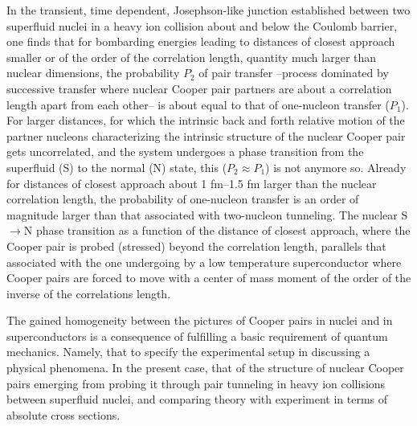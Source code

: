 In the transient, time dependent, Josephson-like junction established between two superfluid nuclei     in a heavy ion collision about and below the Coulomb barrier, one finds that for bombarding energies leading to distances of closest approach smaller or of the order of the correlation length, quantity much larger than nuclear dimensions, the probability $P_2$ of pair transfer --process dominated by successive transfer where nuclear Cooper pair partners are about a correlation length apart from each other-- is about equal to that of one-nucleon transfer ($P_1$). For larger distances, for which the intrinsic back and forth relative motion of the partner nucleons characterizing the intrinsic structure of the nuclear Cooper pair gets uncorrelated, and the system undergoes a phase transition from the superfluid (S) to the normal (N) state, this ($P_2\approx P_1$) is not anymore so. Already for distances of closest approach about 1 fm--1.5 fm larger than the nuclear correlation length, the probability of one-nucleon transfer is an order of magnitude larger than that associated with two-nucleon tunneling. The nuclear S$\to$N phase transition as a function of the distance of closest approach, where the Cooper pair is probed (stressed) beyond the correlation length, parallels that associated with the one undergoing by a low temperature superconductor where Cooper pairs are forced to move with a center of mass moment of the order of the inverse of the correlations length.

 The gained homogeneity  between the pictures of Cooper pairs in nuclei and in superconductors is a consequence of fulfilling a basic requirement of quantum mechanics. Namely, that to specify the experimental setup in discussing a physical phenomena. In the present case, that of the structure of nuclear Cooper pairs emerging from probing it through pair tunneling in heavy ion collisions between superfluid nuclei, and comparing theory with experiment in terms of absolute cross sections. 




















